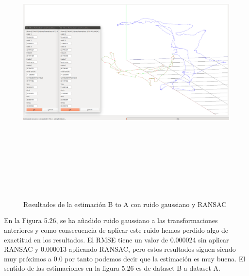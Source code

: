 \begin{figure}[H]
\begin{center}
\label{fig:opciones de View}\includegraphics[height=14.0cm,width=18.0cm]{img/cap6/newData_EscalaTraslaRotaGauss_ba.png}
\hspace{0.5cm}

\end{center}

\caption{Resultados de la estimación B to A con ruido gaussiano y RANSAC}
\end{figure}
En la Figura 5.26, se ha añadido ruido gaussiano a las transformaciones anteriores y como consecuencia de aplicar este ruido hemos perdido algo de exactitud en los resultados.
El RMSE tiene un valor de 0.000024 sin aplicar RANSAC y 0.000013 aplicando RANSAC, pero estos resultados siguen siendo muy próximos a 0.0 por tanto podemos decir que la estimación es muy buena.
El sentido de las estimaciones en la figura 5.26 es de dataset B a dataset A.


